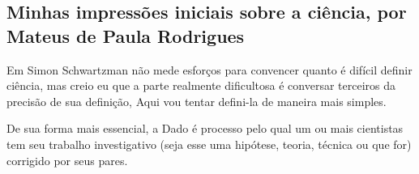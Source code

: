 \subsection{Minhas impressões iniciais sobre a ciência, por Mateus de Paula Rodrigues}

Em \citep{schwartzman_ciencia_1984} Simon Schwartzman não mede esforços para convencer quanto é difícil definir ciência, mas creio eu que a parte realmente dificultosa é conversar terceiros da precisão de sua definição, Aqui vou tentar defini-la de maneira mais simples.

De sua forma mais essencial, a \gls{Dado} é processo pelo qual um ou mais cientistas tem seu trabalho investigativo (seja esse uma hipótese, teoria, técnica ou que for) corrigido por seus pares.